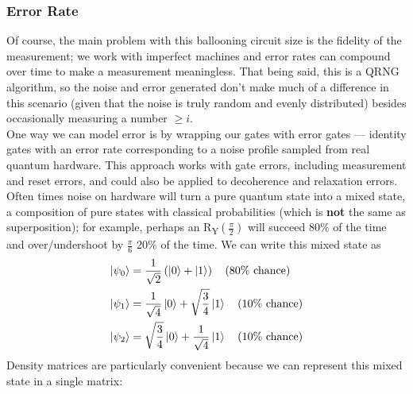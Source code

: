 \documentclass[12pt]{article}
\begin{document}
\subsubsection{Error Rate}
Of course, the main problem with this ballooning circuit size is the fidelity of the measurement; we work with imperfect machines and error rates can compound over time to make a measurement meaningless. 
That being said, this is a QRNG algorithm, so the noise and error generated don't make much of a difference in this scenario (given that the noise is truly random and evenly distributed) besides occasionally measuring a number $ \geq i$. \\
One way we can model error is by wrapping our gates with error gates --- identity gates with an error rate corresponding to a noise profile sampled from real quantum hardware. This approach works with gate errors, including measurement and reset errors, and could also be applied to decoherence and relaxation errors. \\
Often times noise on hardware will turn a pure quantum state into a mixed state, a composition of pure states with classical probabilities (which is \textbf{not} the same as superposition); for example, perhaps an R\textsubscript{Y}$(\frac{\pi}{2})$ will succeed $80\%$ of the time and over/undershoot by $\frac{\pi}{6}$ 20\% of the time. We can write this mixed state as
\begin{align*}
\ket{\psi_0} &= \frac{1}{\sqrt{2}} \left( \ket{0} + \ket{1} \right) \ \ \ \text{(80\% chance)} \\
\ket{\psi_1} &= \frac{1}{\sqrt{4}} \ket{0} + \sqrt{\frac{3}{4}} \ket{1} \ \ \ \text{(10\% chance)} \\
\ket{\psi_2} &= \sqrt{\frac{3}{4}} \ket{0} + \frac{1}{\sqrt{4}} \ket{1} \ \ \ \text{(10\% chance)}
\end{align*}
Density matrices are particularly convenient because we can represent this mixed state in a single matrix:
\end{document}
